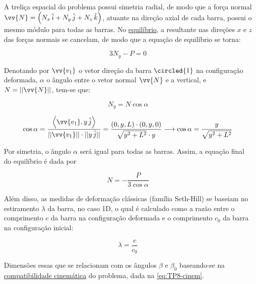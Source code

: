 \begin{textocaixa}
\hspace{10mm}

A treliça espacial do problema possui simetria radial, de modo que a força normal
$\vv{N} = \left(N_x\,\hat{i} + N_y\,\hat{j} + N_z\,\hat{k}\right)$, atuante na direção axial
de cada barra, possui o mesmo módulo para todas as barras. No \underline{equilíbrio}, a
resultante nas direções $x$ e $z$ das forças normais se cancelam, de modo que a equação de
equilíbrio se torna:

\begin{equation}
	3N_y - P = 0
	\label{eq:TP8-equi_init}
\end{equation}

Denotando por $\vv{v_1}$ o vetor direção da barra $\circled{1}$ na configuração deformada,
$\alpha$ o ângulo entre o vetor normal $\vv{N}$ e a vertical, e $N = ||\vv{N}||$,
tem-se que:

\begin{equation}
	N_y = N\cos\alpha
	\label{eq:TP8-Ny}
\end{equation}

\begin{equation}
	\cos\alpha = \frac{\left<\vv{v_1}, y\,\hat{j}\right>}
					  {||\vv{v_1}||\cdot
					   ||y\,\hat{j}||}
	= \frac{\left(0, y, L\right)\cdot\left(0, y, 0\right)}
		   {\sqrt{y^2 + L^2}\cdot y}
	\longrightarrow \cos\alpha = \frac{y}{\sqrt{y^2 + L^2}}
	\label{eq:TP8-cos_alpha}
\end{equation}

Por simetria, o ângulo $\alpha$ será igual para todas as barras. Assim, a equação final do
equilíbrio é dada por

\begin{equation}
	N = -\frac{P}{3\cos\alpha}
	\label{eq:TP8-equi}
\end{equation}

Além disso, as medidas de deformação clássicas (família Seth-Hill) se baseiam no estiramento
$\lambda$ da barra, no caso 1D, o qual é calculado como a razão entre o comprimento $c$ da
barra na configuração deformada e o comprimento $c_0$ da barra na configuração inicial:

\begin{equation}
	\lambda = \frac{c}{c_0}
	\label{eq:TP8-estiramento_init}
\end{equation}

Dimensões essas que se relacionam com os ângulos $\beta$ e $\beta_0$ baseando-se na
\underline{compatibilidade cinemática} do problema, dada na \autoref{eq:TP8-cinem}.


\end{textocaixa}
